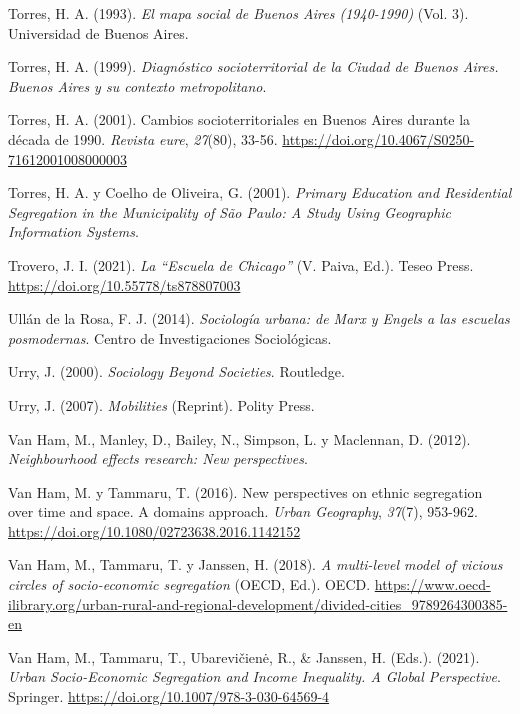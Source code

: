 \documentclass[
  spanish,
  a4paper,%
  chapterprefix=true,%
  DIV=calc,%
  twoside]{scrbook}%
\newlength{\cslhangindent}
\newenvironment{CSLReferences}[2] %
 {\begin{list}{}{%
  \setlength{\itemindent}{0pt}
  \setlength{\leftmargin}{0pt}
  \setlength{\parsep}{0pt}
  \ifodd #1
   \setlength{\leftmargin}{\cslhangindent}
   \setlength{\itemindent}{-1\cslhangindent}
  \fi
  \setlength{\itemsep}{#2\baselineskip}}}
 {\end{list}}
\begin{document}
\begin{CSLReferences}{1}{0}
Torres, H. A. (1993). \emph{El mapa social de Buenos Aires (1940-1990)} (Vol. 3). Universidad de Buenos Aires.

Torres, H. A. (1999). \emph{Diagnóstico socioterritorial de la Ciudad de Buenos Aires. Buenos Aires y su contexto metropolitano}.

Torres, H. A. (2001). Cambios socioterritoriales en Buenos Aires durante la década de 1990. \emph{Revista eure}, \emph{27}(80), 33-56. \url{https://doi.org/10.4067/S0250-71612001008000003}

Torres, H. A. y Coelho de Oliveira, G. (2001). \emph{Primary Education and Residential Segregation in the Municipality of São Paulo: A Study Using Geographic Information Systems}.

Trovero, J. I. (2021). \emph{La {``}Escuela de Chicago{''}} (V. Paiva, Ed.). Teseo Press. \url{https://doi.org/10.55778/ts878807003}

Ullán de la Rosa, F. J. (2014). \emph{Sociología urbana: de Marx y Engels a las escuelas posmodernas}. Centro de Investigaciones Sociológicas.

Urry, J. (2000). \emph{Sociology Beyond Societies}. Routledge.

Urry, J. (2007). \emph{Mobilities} (Reprint). Polity Press.

Van Ham, M., Manley, D., Bailey, N., Simpson, L. y Maclennan, D. (2012). \emph{Neighbourhood effects research: New perspectives}.

Van Ham, M. y Tammaru, T. (2016). New perspectives on ethnic segregation over time and space. A domains approach. \emph{Urban Geography}, \emph{37}(7), 953-962. \url{https://doi.org/10.1080/02723638.2016.1142152}

Van Ham, M., Tammaru, T. y Janssen, H. (2018). \emph{A multi-level model of vicious circles of socio-economic segregation} (OECD, Ed.). OECD. \url{https://www.oecd-ilibrary.org/urban-rural-and-regional-development/divided-cities_9789264300385-en}

Van Ham, M., Tammaru, T., Ubarevičienė, R., \& Janssen, H. (Eds.). (2021). \emph{Urban Socio-Economic Segregation and Income Inequality. A Global Perspective}. Springer. \url{https://doi.org/10.1007/978-3-030-64569-4}


\end{CSLReferences}
\end{document}
